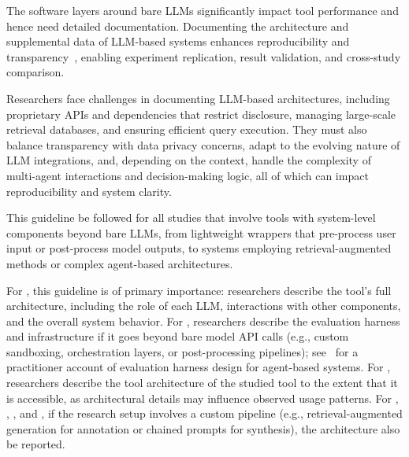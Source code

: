 The software layers around bare LLMs significantly impact tool performance and hence need detailed documentation.
Documenting the architecture and supplemental data of LLM-based systems enhances reproducibility and transparency~\cite{DBLP:journals/software/LuZXXW24}, enabling experiment replication, result validation, and cross-study comparison.


Researchers face challenges in documenting LLM-based architectures, including proprietary APIs and dependencies that restrict disclosure, managing large-scale retrieval databases, and ensuring efficient query execution.
They must also balance transparency with data privacy concerns, adapt to the evolving nature of LLM integrations, and, depending on the context, handle the complexity of multi-agent interactions and decision-making logic, all of which can impact reproducibility and system clarity.


This guideline \must be followed for all studies that involve tools with system-level components beyond bare LLMs, from lightweight wrappers that pre-process user input or post-process model outputs, to systems employing retrieval-augmented methods or complex agent-based architectures.

For \newtools, this guideline is of primary importance: researchers \must describe the tool's full architecture, including the role of each LLM, interactions with other components, and the overall system behavior.
For \benchmarkingtasks, researchers \should describe the evaluation harness and infrastructure if it goes beyond bare model API calls (e.g., custom sandboxing, orchestration layers, or post-processing pipelines); see~\cite{Anthropic2025evals} for a practitioner account of evaluation harness design for agent-based systems.
For \llmusage, researchers \should describe the tool architecture of the studied tool to the extent that it is accessible, as architectural details may influence observed usage patterns.
For \annotators, \judges, \synthesis, and \subjects, if the research setup involves a custom pipeline (e.g., retrieval-augmented generation for annotation or chained prompts for synthesis), the architecture \should also be reported.


